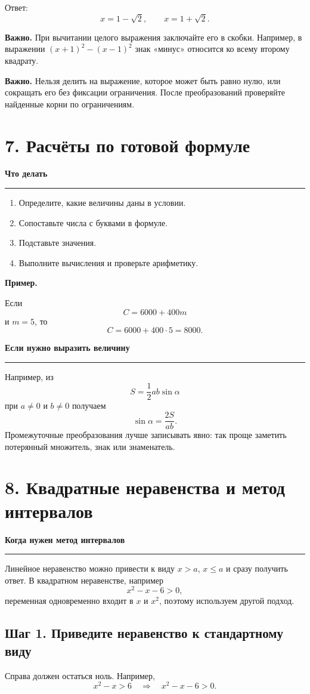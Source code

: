 \documentclass[a4paper,12pt]{article}
\newcommand{\keyidea}[1]{%
  \par\medskip
  {\bfseries\color{darkaccent}#1}\par
  \vspace{1pt}
  {\color{accent}\rule{\linewidth}{0.55pt}}\par
  \vspace{2pt}
}
\newcommand{\important}[1]{%
  \par\smallskip
  \noindent\textbf{\color{darkaccent}Важно.} #1\par
}
\newcommand{\exampletitle}{%
  \par\smallskip
  \noindent\textbf{\color{accent}Пример.}\enspace
}
\begin{document}
Ответ:
\[
x=1-\sqrt2,
\qquad
x=1+\sqrt2.
\]

\important{При вычитании целого выражения заключайте его в скобки. Например, в выражении \((x+1)^2-(x-1)^2\) знак «минус» относится ко всему второму квадрату.}

\important{Нельзя делить на выражение, которое может быть равно нулю, или сокращать его без фиксации ограничения. После преобразований проверяйте найденные корни по ограничениям.}

\section{7. Расчёты по готовой формуле}

\keyidea{Что делать}
\begin{enumerate}[leftmargin=8mm,itemsep=1mm,topsep=2mm]
  \item Определите, какие величины даны в условии.
  \item Сопоставьте числа с буквами в формуле.
  \item Подставьте значения.
  \item Выполните вычисления и проверьте арифметику.
\end{enumerate}

\exampletitle
Если
\[
C=6000+400m
\]
и \(m=5\), то
\[
C=6000+400\cdot5=8000.
\]

\keyidea{Если нужно выразить величину}
Например, из
\[
S=\frac12 ab\sin\alpha
\]
при \(a\ne0\) и \(b\ne0\) получаем
\[
\sin\alpha=\frac{2S}{ab}.
\]
Промежуточные преобразования лучше записывать явно: так проще заметить потерянный множитель, знак или знаменатель.

\section{8. Квадратные неравенства и метод интервалов}

\keyidea{Когда нужен метод интервалов}
Линейное неравенство можно привести к виду \(x>a\), \(x\le a\) и сразу получить ответ. В квадратном неравенстве, например
\[
x^2-x-6>0,
\]
переменная одновременно входит в \(x\) и \(x^2\), поэтому используем другой подход.

\subsection{Шаг 1. Приведите неравенство к стандартному виду}
Справа должен остаться ноль. Например,
\[
x^2-x>6
\quad\Longrightarrow\quad
x^2-x-6>0.
\]
\end{document}
